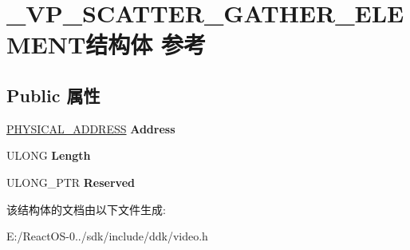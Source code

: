 \hypertarget{struct___v_p___s_c_a_t_t_e_r___g_a_t_h_e_r___e_l_e_m_e_n_t}{}\section{\+\_\+\+V\+P\+\_\+\+S\+C\+A\+T\+T\+E\+R\+\_\+\+G\+A\+T\+H\+E\+R\+\_\+\+E\+L\+E\+M\+E\+N\+T结构体 参考}
\label{struct___v_p___s_c_a_t_t_e_r___g_a_t_h_e_r___e_l_e_m_e_n_t}
\subsection*{Public 属性}
\begin{DoxyCompactItemize}
\item 
\mbox{\label{struct___v_p___s_c_a_t_t_e_r___g_a_t_h_e_r___e_l_e_m_e_n_t_ad2b91a9eb83fe678b0d98e3f01443c9b}} 
\hyperlink{union___l_a_r_g_e___i_n_t_e_g_e_r}{P\+H\+Y\+S\+I\+C\+A\+L\+\_\+\+A\+D\+D\+R\+E\+SS} {\bfseries Address}
\item 
\mbox{\label{struct___v_p___s_c_a_t_t_e_r___g_a_t_h_e_r___e_l_e_m_e_n_t_a38978589598a8a5566f3111384e6ac22}} 
U\+L\+O\+NG {\bfseries Length}
\item 
\mbox{\label{struct___v_p___s_c_a_t_t_e_r___g_a_t_h_e_r___e_l_e_m_e_n_t_a6b4bd559c7b8d1ac5c6d27cf9929820b}} 
U\+L\+O\+N\+G\+\_\+\+P\+TR {\bfseries Reserved}
\end{DoxyCompactItemize}


该结构体的文档由以下文件生成\+:\begin{DoxyCompactItemize}
\item 
E\+:/\+React\+O\+S-\/0../sdk/include/ddk/video.\+h\end{DoxyCompactItemize}
